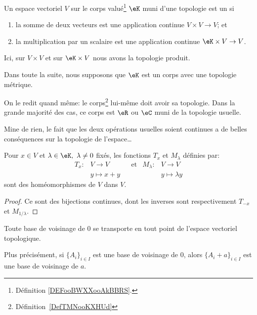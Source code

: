 \begin{definition}\label{DefEVTopologique}
    Un espace vectoriel \( V\) sur le corps valué\footnote{Définition \ref{DEFooBWXXooAkBBRS}.} \( \eK\) muni d'une topologie est un  si
    \begin{enumerate}
        \item
            la somme de deux vecteurs est une application continue \( V\times V\to V \); et
        \item
            la multiplication par un scalaire est une application continue \( \eK\times V\to V\).
    \end{enumerate}
    Ici, sur \( V\times V\) et sur \( \eK\times V\) nous avons la topologie produit.

    Dans toute la suite, nous supposons que \( \eK\) est un corps avec une topologie métrique.
\end{definition}
On le redit quand même: le corps\footnote{Définition~\ref{DefTMNooKXHUd}} lui-même doit avoir sa topologie. Dans la grande majorité des cas, ce corps est \( \eR\) ou \( \eC\) muni de la topologie usuelle.

Mine de rien, le fait que les deux opérations usuelles soient continues a de belles conséquences sur la topologie de l'espace\dots

\begin{proposition}
  Pour \(x \in V \) et \(\lambda \in \eK, \ \lambda \neq 0 \) fixés, les fonctions \( T_x \) et \( M_\lambda \) définies par:
  \begin{align}
    T_x:&V \to V & &\text{et}&M_\lambda:&V \to V\\
    & y \mapsto x+y & & & &y \mapsto \lambda y
  \end{align}
sont des homéomorphismes de \(V \) dans \(V \).
\end{proposition}

\begin{proof}
  Ce sont des bijections continues, dont les inverses sont respectivement \( T_{-x} \) et \( M_{1/\lambda} \).
\end{proof}

\begin{corollary}\label{PropInvarianceTopologie}
  Toute base de voisinage de \( 0 \) se transporte en tout point de l'espace vectoriel topologique.

  Plus précisément, si \( \{ A_i \}_{i\in I}\) est une base de voisinage de \( 0\), alors \( \{ A_i+a \}_{i\in I}\) est une base de voisinage de \( a\).
\end{corollary}


